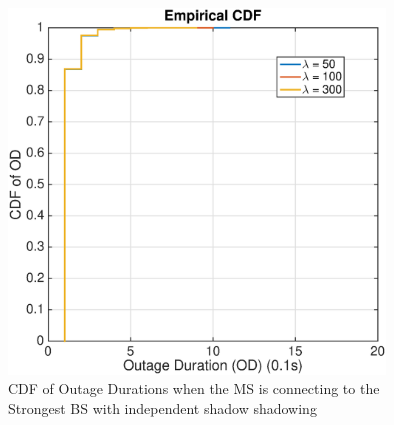  \begin{figure}
 \centering
 \includegraphics[width=10cm]{ODthresh-5iidMax.eps}
 \caption{CDF of Outage Durations when the MS is connecting to the Strongest BS with independent shadow shadowing}
 \label{iid2}
 \end{figure}
 

